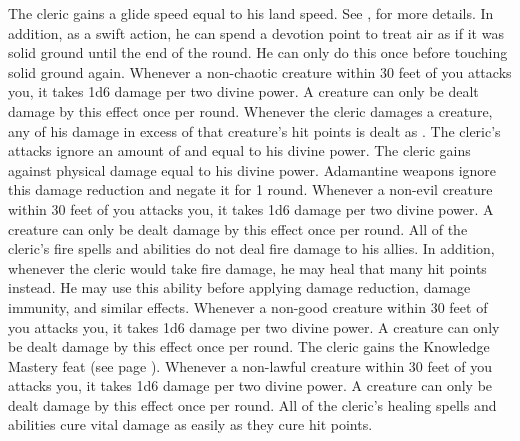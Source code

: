             The cleric gains a glide speed equal to his land speed.
            See , for more details.
            In addition, as a swift action, he can spend a devotion point to treat air as if it was solid ground until the end of the round.
            He can only do this once before touching solid ground again.
            Whenever a non-chaotic creature within 30 feet of you attacks you, it takes 1d6 damage per two divine power.
            A creature can only be dealt damage by this effect once per round.
            Whenever the cleric damages a creature, any of his damage in excess of that creature's hit points is dealt as .
            The cleric's attacks ignore an amount of  and  equal to his divine power.
            The cleric gains  against physical damage equal to his divine power.
            Adamantine weapons ignore this damage reduction and negate it for 1 round.
            Whenever a non-evil creature within 30 feet of you attacks you, it takes 1d6 damage per two divine power.
            A creature can only be dealt damage by this effect once per round.
            All of the cleric's fire spells and abilities do not deal fire damage to his allies.
            In addition, whenever the cleric would take fire damage, he may heal that many hit points instead.
            He may use this ability before applying damage reduction, damage immunity, and similar effects.
            Whenever a non-good creature within 30 feet of you attacks you, it takes 1d6 damage per two divine power.
            A creature can only be dealt damage by this effect once per round.
            The cleric gains the Knowledge Mastery feat (see page ).
            Whenever a non-lawful creature within 30 feet of you attacks you, it takes 1d6 damage per two divine power.
            A creature can only be dealt damage by this effect once per round.
            All of the cleric's healing spells and abilities cure vital damage as easily as they cure hit points.
